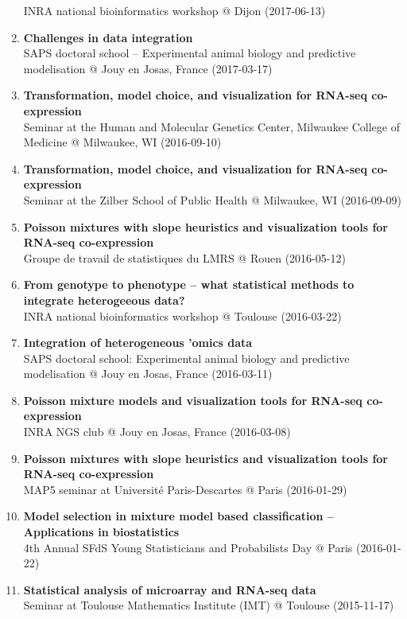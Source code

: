\documentclass[11pt, a4paper]{awesome-cv}
\begin{document}
\begin{enumerate}
  INRA national bioinformatics workshop @ Dijon (2017-06-13)
\item
  \textbf{Challenges in data integration}\\
  SAPS doctoral school -- Experimental animal biology and predictive
  modelisation @ Jouy en Josas, France (2017-03-17)
\item
  \textbf{Transformation, model choice, and visualization for RNA-seq
  co-expression}\\
  Seminar at the Human and Molecular Genetics Center, Milwaukee College
  of Medicine @ Milwaukee, WI (2016-09-10)
\item
  \textbf{Transformation, model choice, and visualization for RNA-seq
  co-expression}\\
  Seminar at the Zilber School of Public Health @ Milwaukee, WI
  (2016-09-09)
\item
  \textbf{Poisson mixtures with slope heuristics and visualization tools
  for RNA-seq co-expression}\\
  Groupe de travail de statistiques du LMRS @ Rouen (2016-05-12)
\item
  \textbf{From genotype to phenotype -- what statistical methods to
  integrate heterogeeous data?}\\
  INRA national bioinformatics workshop @ Toulouse (2016-03-22)
\item
  \textbf{Integration of heterogeneous 'omics data}\\
  SAPS doctoral school: Experimental animal biology and predictive
  modelisation @ Jouy en Josas, France (2016-03-11)
\item
  \textbf{Poisson mixture models and visualization tools for RNA-seq
  co-expression}\\
  INRA NGS club @ Jouy en Josas, France (2016-03-08)
\item
  \textbf{Poisson mixtures with slope heuristics and visualization tools
  for RNA-seq co-expression}\\
  MAP5 seminar at Université Paris-Descartes @ Paris (2016-01-29)
\item
  \textbf{Model selection in mixture model based classification --
  Applications in biostatistics}\\
  4th Annual SFdS Young Statisticians and Probabilists Day @ Paris
  (2016-01-22)
\item
  \textbf{Statistical analysis of microarray and RNA-seq data}\\
  Seminar at Toulouse Mathematics Institute (IMT) @ Toulouse
  (2015-11-17)

\end{enumerate}
\end{document}
